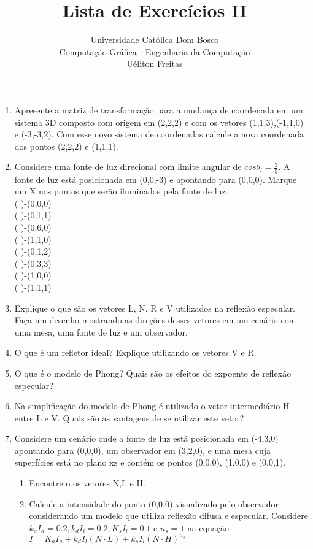 \documentclass[12pt,a4paper]{article}
\author{Universidade Católica Dom Bosco \\ Computação Gráfica - Engenharia da Computação \\Uéliton Freitas}
\title{Lista de Exercícios II}
\begin{document}
\maketitle


\begin{enumerate}
	\item Apresente a matriz de transformação para a mudança de coordenada em um sistema 3D composto com origem em (2,2,2) e com os vetores (1,1,3),(-1,1,0) e (-3,-3,2). Com esse novo sistema de coordenadas calcule a nova coordenada dos pontos (2,2,2) e (1,1,1).
	
	\item Considere uma fonte de luz direcional com limite angular de $cos \theta_l = \frac{3}{5}$. A fonte de luz está posicionada em (0,0,-3) e apontando para (0,0,0). Marque um X nos pontos que serão iluminados pela fonte de luz.\\
	( )-(0,0,0)\\
	( )-(0,1,1)\\
	( )-(0,6,0)\\
	( )-(1,1,0)\\
	( )-(0,1,2)\\
	( )-(0,3,3)\\
	( )-(1,0,0)\\
	( )-(1,1,1)\\

	\item Explique o que são os vetores L, N, R e V utilizados na reflexão especular.
Faça um desenho mostrando as direções desses vetores em um cenário com uma mesa, uma fonte de luz e um observador.

	\item O que é um refletor ideal? Explique utilizando os vetores V e R.
	
	\item O que é o modelo de Phong? Quais são os efeitos do expoente de reflexão
especular?

	\item Na simplificação do modelo de Phong é utilizado o vetor intermediário H
entre L e V. Quais são as vantagens de se utilizar este vetor?

	\item Considere um cenário onde a fonte de luz está posicionada em (-4,3,0) apontando para (0,0,0), um observador em (3,2,0), e uma mesa cuja superfícies está no plano xz e contém os pontos (0,0,0), (1,0,0) e (0,0,1).
		\begin{enumerate}
			\item Encontre o os vetores N,L e H.
			\item Calcule a intensidade do ponto (0,0,0) visualizado pelo observador considerando um modelo que utiliza reflexão difusa e especular. Considere  $k_a I_a = 0.2, k_d I_l = 0.2, K_s I_l =0.1$ e $n_s =1$ na equação $I = K_a I_a + k_d I_l(N \cdot L)+k_s I_l(N \cdot H)^{n_s}$
		\end{enumerate}
		

\end{enumerate}
\end{document}
